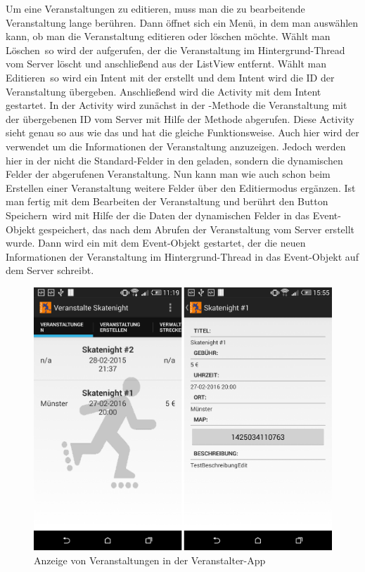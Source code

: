 Um eine Veranstaltungen zu editieren, muss man die zu bearbeitende Veranstaltung lange berühren. Dann öffnet sich ein Menü, in dem man auswählen kann, ob man die Veranstaltung editieren oder löschen möchte. Wählt man \glqq Löschen\grqq\ so wird der  aufgerufen, der die Veranstaltung im Hintergrund-Thread vom Server löscht und anschließend aus der ListView entfernt. Wählt man \glqq Editieren\grqq\ so wird ein Intent mit der  erstellt und dem Intent wird die ID der Veranstaltung übergeben. Anschließend wird die Activity mit dem Intent gestartet. In der Activity wird zunächst in der -Methode die Veranstaltung mit der übergebenen ID vom Server  mit Hilfe der  Methode abgerufen. Diese Activity sieht genau so aus wie das  und hat die gleiche Funktionsweise. Auch hier wird der  verwendet um die Informationen der Veranstaltung anzuzeigen. Jedoch werden hier in der  nicht die Standard-Felder in den  geladen, sondern die dynamischen Felder der abgerufenen Veranstaltung. Nun kann man wie auch schon beim Erstellen einer Veranstaltung weitere Felder über den Editiermodus ergänzen. Ist man fertig mit dem Bearbeiten der Veranstaltung und berührt den Button \glqq Speichern\grqq\ wird mit Hilfe der  die Daten der dynamischen Felder in das Event-Objekt gespeichert, das nach dem Abrufen der Veranstaltung vom Server erstellt wurde. Dann wird ein  mit dem Event-Objekt gestartet, der die neuen Informationen der Veranstaltung im Hintergrund-Thread in das Event-Objekt auf dem Server schreibt.

\label{par:VeranstaltungenAnzeigen}
\begin{figure}[htb]
\centering
\includegraphics[width=12 cm]{graphics/show_events_veranstalter_app.png}
\caption{Anzeige von Veranstaltungen in der Veranstalter-App}
\label{fig:VeranstaltungAnzeigenVeranstalterapp}
\end{figure}

